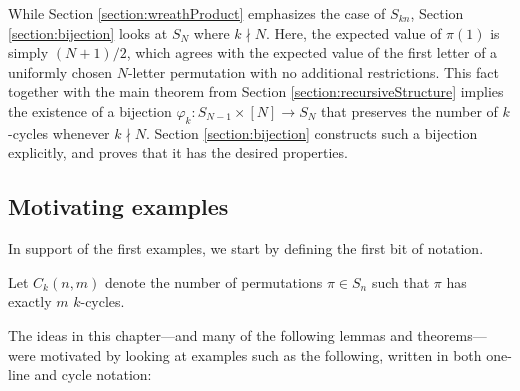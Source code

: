 While Section \ref{section:wreathProduct} emphasizes the case of $S_{kn}$,
Section \ref{section:bijection} looks at $S_N$ where $k \nmid N$. Here, the
expected value of $\pi(1)$ is simply $(N+1)/2$, which agrees with the expected
value of the first letter of a uniformly chosen $N$-letter permutation with
no additional restrictions. This fact together with the main
theorem from Section \ref{section:recursiveStructure} implies the existence of a
bijection $\varphi_k \colon S_{N-1} \times [N] \rightarrow S_N$ that preserves the
number of $k$-cycles whenever $k \nmid N$. Section \ref{section:bijection}
constructs such a bijection explicitly, and proves that it has the desired
properties.

\subsection{Motivating examples}

In support of the first examples, we start by defining the first bit of notation.
\begin{definition}
  Let $C_k(n,m)$ denote the number of permutations $\pi \in S_n$ such that
  $\pi$ has exactly $m$ $k$-cycles.
\end{definition}

The ideas in this chapter---and many of the following lemmas and theorems---were
motivated by looking at examples such as the following, written in both
one-line and cycle notation:


